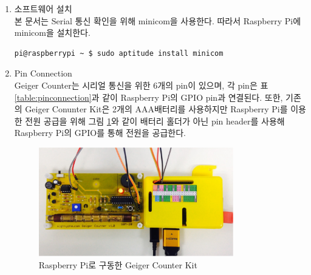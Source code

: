 \documentclass[11pt
  , a4paper
  , article
  , oneside
]{memoir}
\begin{document}
\begin{enumerate}
\item 소프트웨어 설치\\
본 문서는 Serial 통신 확인을 위해 minicom을 사용한다. 따라서 Raspberry Pi에 minicom을 설치한다.

\begin{lstlisting}[style=termstyle]
pi@raspberrypi ~ $ sudo aptitude install minicom
\end{lstlisting}

\item Pin Connection\\
Geiger Counter는 시리얼 통신을 위한 6개의 pin이 있으며, 각 pin은 표 \ref{table:pinconnection}과 같이 Raspberry Pi의 GPIO pin과 연결된다. 또한, 기존의 Geiger Conunter Kit은 2개의 AAA배터리를 사용하지만 Raspberry Pi를 이용한 전원 공급을 위해 그림 \ref{fig:drive_gconpi}와 같이 배터리 홀더가 아닌 pin header를 사용해 Raspberry Pi의 GPIO를 통해 전원을 공급한다.

\begin{figure}[h!]
  \centering
  \includegraphics[width=0.8\textwidth]{./images/geiger+rpi.eps}
  \caption{Raspberry Pi로 구동한 Geiger Counter Kit}
  \label{fig:drive_gconpi}   
\end{figure}



\end{enumerate}
\end{document}
